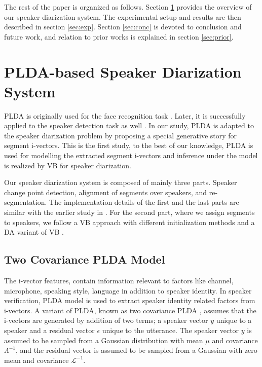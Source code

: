 \documentclass{article}
\begin{document}
The rest of the paper is organized as follows. Section \ref{sec:PLDA_SD} provides the overview of our speaker diarization system. The experimental setup and results are then described in section \ref{sec:exp}. Section \ref{sec:conc} is devoted to conclusion and future work, and relation to prior works is explained in section \ref{sec:prior}.

\section{PLDA-based Speaker Diarization System}
\label{sec:PLDA_SD}

PLDA is originally used for the face recognition task \cite{prince2007PLDA}. Later, it is successfully applied to the speaker detection task as well \cite{brummer2010system, campell2010system}. In our study, PLDA is adapted to the speaker diarization problem by proposing a special generative story for segment i-vectors. This is the first study, to the best of our knowledge, PLDA is used for modelling the extracted segment i-vectors and inference under the model is realized by VB for speaker diarization.

Our speaker diarization system is composed of mainly three parts. Speaker change point detection, alignment of segments over speakers, and re-segmentation. The implementation details of the first and the last parts are similar with the earlier study in \cite{mit2004diarization}. For the second part, where we assign segments to speakers, we follow a VB approach with different initialization methods and a DA variant of VB \cite{katahira2008DAVB}.

\subsection{Two Covariance PLDA Model}

The i-vector features, contain information relevant to factors like channel, microphone, speaking style, language in addition to speaker identity. In speaker verification, PLDA model is used to extract speaker identity related factors from i-vectors. A variant of PLDA, known as two covariance PLDA \cite{brummer2010twocov}, assumes that the i-vectors are generated by addition of two terms; a speaker vector $y$ unique to a speaker and a residual vector $\epsilon$ unique to the utterance. The speaker vector $y$ is assumed to be sampled from a Gaussian distribution with mean $\mu$ and covariance $\Lambda^{-1}$, and the residual vector is assumed to be sampled from a Gaussian with zero mean and covariance $\mathcal{L}^{-1}$. 
\end{document}
